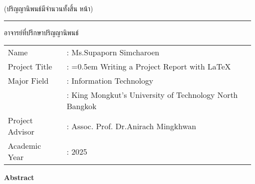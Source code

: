 \begin{flushright}
(ปริญญานิพนธ์มีจำนวนทั้งสิ้น \pageref{LastPage} หน้า)

\vfill
\rule{10 cm}{0.4pt} อาจารย์ที่ปรึกษาปริญญานิพนธ์ 

\end{flushright}





\newpage
{}
{}
\begin{tabularx}{\textwidth}{lX}
Name                    & : Ms.Supaporn Simcharoen  %
\\
Project Title           & : \hangindent=0.5em %
                            Writing a Project Report with LaTeX  %
\\
Major Field             & : Information Technology %
\\
                        & : King Mongkut’s University of Technology North Bangkok
\\
Project Advisor         & : Assoc. Prof. Dr.Anirach Mingkhwan   %
\\
Academic Year           & : 2025    %
\end{tabularx}

\vspace{5mm}
\begin{center}\textbf{Abstract}\end{center}

